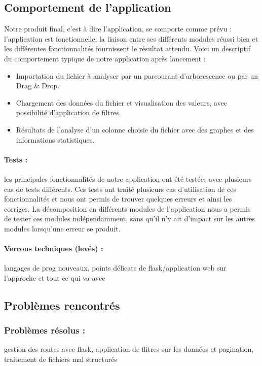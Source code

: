 		\subsection{Comportement de l'application}
		Notre produit final, c'est à dire l'application, se comporte comme prévu : l'application est fonctionnelle, la liaison entre ses différents modules réussi bien et les différentes fonctionnalités fournissent le résultat attendu. Voici un descriptif du comportement typique de notre application après lancement :
		\begin{itemize}
			\item Importation du fichier à analyser par un parcourant d'arborescence ou par un Drag \& Drop.
			\item Chargement des données du fichier et visualisation des valeurs, avec possibilité d'application de filtres. 
			\item Résultats de l'analyse d'un colonne choisie du fichier avec des graphes et des informations statistiques.
		\end{itemize}
		\paragraph{Tests :} les principales fonctionnalités de notre application ont été testées avec plusieurs cas de tests différents. Ces tests ont traité plusieurs cas d'utilisation de ces fonctionnalités et nous ont permis de trouver quelques erreurs et ainsi les corriger. La décomposition en différents modules de l'application nous a permis de tester ces modules indépendamment, sans qu'il n'y ait d'impact sur les autres modules lorsqu'une erreur se produit. 
		
		\paragraph{Verrous techniques (levés) :} langages de prog nouveaux, points délicats de flask/application web sur l'approche et tout ce qui va avec
	
		
		\subsection{Problèmes rencontrés}
			\subsubsection*{Problèmes résolus :} gestion des routes avec flask, application de flitres sur les données et pagination, traitement de fichiers mal structurés 
			
